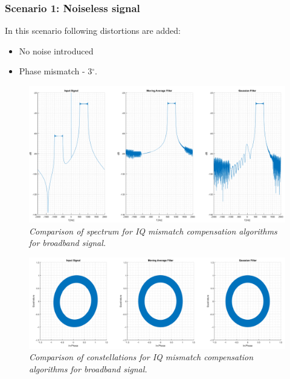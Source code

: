 \documentclass[en,printmode]{mgr}
\begin{document}
		\subsubsection*{Scenario 1: Noiseless signal}
			In this scenario following distortions are added:
			\begin{itemize}
				\item No noise introduced
				\item Phase mismatch - 3$^\circ$.
			\end{itemize}
			\begin{figure}[!htb]
    			\centering
   				\includegraphics[width=\textwidth]{plots/band_f.png}
   		 		\caption{\textit{Comparison of spectrum for IQ mismatch compensation algorithms for
   		 		broadband signal.}}
   		 	\end{figure}	
   		 	\begin{figure}[!htb]
    			\centering
   				\includegraphics[width=\textwidth]{plots/band_c.png}
   		 		\caption{\textit{Comparison of constellations for IQ mismatch compensation algorithms 
   		 		for broadband signal.}}
   		 	\end{figure}
   		\newpage
\end{document}
